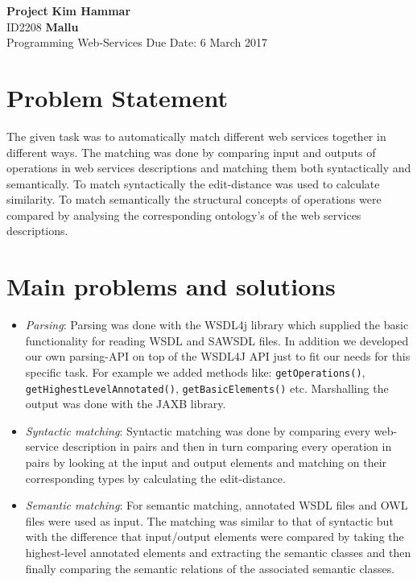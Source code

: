 \documentclass[a4paper, 11pt]{article}
\begin{document}
\noindent
\large\textbf{Project} \hfill \textbf{Kim Hammar} \\
\normalsize ID2208 \hfill  \textbf{Mallu} \\
Programming Web-Services \hfill Due Date: 6 March 2017\\

\section*{Problem Statement}
The given task was to automatically match different web services together in different ways. The matching was done by comparing input and outputs of operations in web services descriptions and matching them both syntactically and semantically. To match syntactically the edit-distance was used to calculate similarity. To match semantically the structural concepts of operations were compared by analysing the corresponding ontology's of the web services descriptions.

\section*{Main problems and solutions}
\begin{itemize}
\item \textit{Parsing}: Parsing was done with the WSDL4j library which supplied the basic functionality for reading WSDL and SAWSDL files. In addition we developed our own parsing-API on top of the WSDL4J API just to fit our needs for this specific task. For example we added methods like: \texttt{getOperations()}, \texttt{getHighestLevelAnnotated()}, \texttt{getBasicElements()} etc. Marshalling the output was done with the JAXB library.
\item \textit{Syntactic matching}: Syntactic matching was done by comparing every web-service description in pairs and then in turn comparing every operation in pairs by looking at the input and output elements and matching on their corresponding types by calculating the edit-distance. 
\item \textit{Semantic matching}: For semantic matching, annotated WSDL files and OWL files were used as input. The matching was similar to that of syntactic but with the difference that input/output elements were compared by taking the highest-level annotated elements and extracting the semantic classes and then finally comparing the semantic relations of the associated semantic classes. 
\end{itemize}
\end{document}
